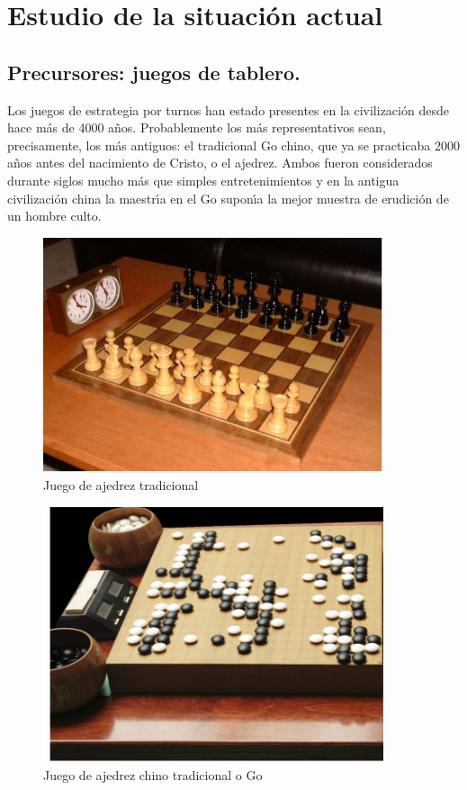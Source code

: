 \section{Estudio de la situaci\'on actual}
\label{sec:estado-actual}

\subsection{Precursores: juegos de tablero.}

Los juegos de estrategia por turnos han estado presentes en la civilizaci\'on desde hace m\'as de 4000 a\~nos. Probablemente los m\'as representativos sean, precisamente, los m\'as antiguos: el tradicional Go chino, que ya se practicaba 2000 a\~nos antes del nacimiento de Cristo, o el ajedrez. Ambos fueron considerados durante siglos mucho m\'as que simples entretenimientos y en la antigua civilizaci\'on china la maestr\'{\i}a en el Go supon\'{\i}a la mejor muestra de erudici\'on de un hombre culto.\\

\begin{figure}[h]
	\centering
		\includegraphics[width=10cm]{images/ajedrez.png}
	\caption{Juego de ajedrez tradicional}
	\label{fig:ajedrez}
\end{figure}

\begin{figure}[h]
	\centering
		\includegraphics[width=10cm]{images/go.png}
	\caption{Juego de ajedrez chino tradicional o Go}
	\label{fig:go}
\end{figure}

